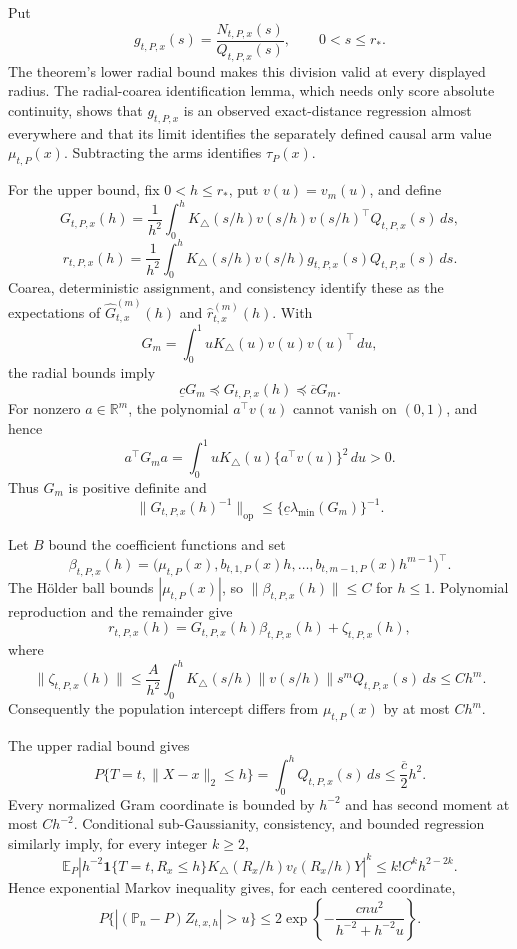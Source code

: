 Put
\[
 g_{t,P,x}(s)=\frac{N_{t,P,x}(s)}{Q_{t,P,x}(s)},
 \qquad 0<s\leq r_*.
\]
The theorem's lower radial bound makes this division valid at every displayed radius.  The radial-coarea identification lemma, which needs only score absolute continuity, shows that \(g_{t,P,x}\) is an observed exact-distance regression almost everywhere and that its limit identifies the separately defined causal arm value \(\mu_{t,P}(x)\).  Subtracting the arms identifies \(\tau_P(x)\).

For the upper bound, fix \(0<h\leq r_*\), put \(v(u)=v_m(u)\), and define
\[
 G_{t,P,x}(h)=\frac1{h^2}\int_0^hK_\triangle(s/h)v(s/h)v(s/h)^\top Q_{t,P,x}(s)\,ds,
\]
\[
 r_{t,P,x}(h)=\frac1{h^2}\int_0^hK_\triangle(s/h)v(s/h)g_{t,P,x}(s)Q_{t,P,x}(s)\,ds.
\]
Coarea, deterministic assignment, and consistency identify these as the expectations of \(\widehat G^{(m)}_{t,x}(h)\) and \(\widehat r^{(m)}_{t,x}(h)\).  With
\[
 G_m=\int_0^1uK_\triangle(u)v(u)v(u)^\top\,du,
\]
the radial bounds imply
\[
 \underline cG_m\preceq G_{t,P,x}(h)\preceq\overline cG_m.
\]
For nonzero \(a\in\mathbb R^m\), the polynomial \(a^\top v(u)\) cannot vanish on \((0,1)\), and hence
\[
 a^\top G_ma=\int_0^1uK_\triangle(u)\{a^\top v(u)\}^2\,du>0.
\]
Thus \(G_m\) is positive definite and
\[
 \lVert G_{t,P,x}(h)^{-1}\rVert_{\mathrm{op}}
 \leq\{\underline c\lambda_{\min}(G_m)\}^{-1}.
\]

Let \(B\) bound the coefficient functions and set
\[
 \beta_{t,P,x}(h)=
 \bigl(\mu_{t,P}(x),b_{t,1,P}(x)h,\ldots,
 b_{t,m-1,P}(x)h^{m-1}\bigr)^\top.
\]
The H\"older ball bounds \(|\mu_{t,P}(x)|\), so \(\|\beta_{t,P,x}(h)\|\leq C\) for \(h\leq1\).  Polynomial reproduction and the remainder give
\[
 r_{t,P,x}(h)=G_{t,P,x}(h)\beta_{t,P,x}(h)+\zeta_{t,P,x}(h),
\]
where
\[
 \|\zeta_{t,P,x}(h)\|
 \leq\frac{A}{h^2}\int_0^hK_\triangle(s/h)\|v(s/h)\|s^mQ_{t,P,x}(s)\,ds
 \leq Ch^m.
\]
Consequently the population intercept differs from \(\mu_{t,P}(x)\) by at most \(Ch^m\).

The upper radial bound gives
\[
 P\{T=t,\lVert X-x\rVert_2\leq h\}
 =\int_0^hQ_{t,P,x}(s)\,ds\leq\frac{\overline c}{2}h^2.
\]
Every normalized Gram coordinate is bounded by \(h^{-2}\) and has second moment at most \(Ch^{-2}\).  Conditional sub-Gaussianity, consistency, and bounded regression similarly imply, for every integer \(k\geq2\),
\[
 \mathbb E_P\left|h^{-2}\mathbf1\{T=t,R_x\leq h\}
 K_\triangle(R_x/h)v_\ell(R_x/h)Y\right|^k
 \leq k!C^kh^{2-2k}.
\]
Hence exponential Markov inequality gives, for each centered coordinate,
\[
 P\{|(\mathbb P_n-P)Z_{t,x,h}|>u\}
 \leq2\exp\!\left\{-\frac{cnu^2}{h^{-2}+h^{-2}u}\right\}.
\]


